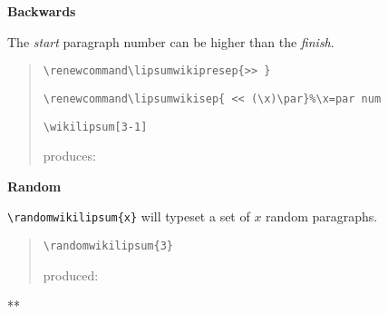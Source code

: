 \documentclass{article}
\newcommand\cmdwl[1]{\texttt{\textbackslash #1}}
\begin{document}
\textbf{Backwards}

The \textit{start} paragraph number can be higher than the \textit{finish}.
\begin{quotation}
\texttt{\textbackslash renewcommand\textbackslash lipsumwikipresep\{>> \}}\par
\texttt{\textbackslash renewcommand\textbackslash lipsumwikisep\{ << (\textbackslash x)\textbackslash par\}\scriptsize{\%\textbackslash x=par num}}\par
\cmdwl{wikilipsum[3-1]}\par produces:\par
\begin{quotation}\sffamily\small
\renewcommand\lipsumwikipresep{>> }
\renewcommand\lipsumwikisep{ << (\x)\par}
\wikilipsum[3-1]
\end{quotation}
\end{quotation}

\textbf{Random}

\cmdwl{randomwikilipsum\{x\}} will typeset a set of $x$ random paragraphs.

\begin{quotation}
\cmdwl{randomwikilipsum\{3\}}\par produced:\par
\begin{quotation}\sffamily\small
{}
\end{quotation}
\end{quotation}



\bigskip
\bigskip

\hfill ***\hfill\ 
\end{document}
